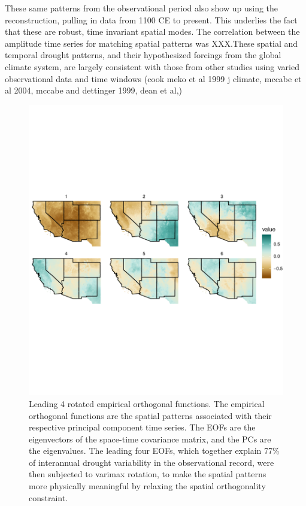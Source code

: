 \documentclass[fleqn,10pt]{wlscirep}
\begin{document}
These same patterns from the observational period also show up using the reconstruction, pulling in data from 1100 CE to present. This underlies the fact that these are robust, time invariant spatial modes. The correlation between the amplitude time series for matching spatial patterns was XXX.These spatial and temporal drought patterns, and their hypothesized forcings from the global climate system, are largely consistent with those from other studies using varied observational data and time windows (cook meko et al 1999 j climate, mccabe et al 2004, mccabe and dettinger 1999, dean et al,)

\begin{figure}[!htbp]
\centering
\includegraphics[width=.8\linewidth]{figures/eof_observed.pdf}
\caption{Leading 4 rotated empirical orthogonal functions. The empirical orthogonal functions are the spatial patterns associated with their respective principal component time series. The EOFs are the eigenvectors of the space-time covariance matrix, and the PCs are the eigenvalues. The leading four EOFs, which together explain 77\% of interannual drought variability in the observational record, were then subjected to varimax rotation, to make the spatial patterns more physically meaningful by relaxing the spatial orthogonality constraint.}
\label{fig:reofs}
\end{figure}

\end{document}
